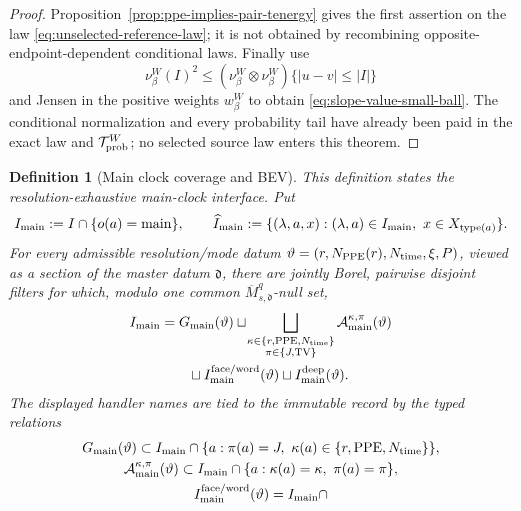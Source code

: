 \documentclass[11pt]{article}
\newtheorem{definition}[theorem]{Definition}
\begin{document}
\begin{proof}
Proposition~\ref{prop:ppe-implies-pair-tenergy} gives the first assertion
on the law \eqref{eq:unselected-reference-law}; it is not obtained by
recombining opposite-endpoint-dependent conditional laws.  Finally use
\[
 \nu_\beta^{W}(I)^2\le
 (\nu_\beta^{W}\otimes\nu_\beta^{W})\{|u-v|\le|I|\}
\]
and Jensen in the positive weights $w_\beta^{W}$ to obtain
\eqref{eq:slope-value-small-ball}.  The conditional normalization and every
probability tail have already been paid in the exact law and
$\mathcal T_{\rm prob}^{W}$; no selected source law enters this theorem.
\end{proof}

\begin{definition}[Main clock coverage and BEV]
\label{def:main-source-BEV}
This definition states the resolution-exhaustive main-clock interface.  Put
\[
 I_{\rm main}:=I\cap\{o(a)={\rm main}\},
 \qquad
 \widehat I_{\rm main}:=
 \{(\lambda,a,x):(\lambda,a)\in I_{\rm main},\
                    x\in X_{\operatorname{type}(a)}\}.
\]
For every admissible resolution/mode datum
$\vartheta=(r,N_{\rm PPE}(r),N_{\rm time},\xi,P)$, viewed as a section of
the master datum $\mathfrak d$, there are jointly Borel,
pairwise disjoint filters for which, modulo one common
$\overline M_{s,\mathfrak d}^{q}$-null set,
\begin{equation}
\label{eq:main-clock-coverage}
\begin{aligned}
 I_{\rm main}
 &=G_{\rm main}(\vartheta)
 \sqcup\!\bigsqcup_{\substack{
      \kappa\in\{r,{\rm PPE},N_{\rm time}\}\\
      \pi\in\{J,{\rm TV}\}}}
      \mathcal A_{\rm main}^{\kappa,\pi}(\vartheta)\\
 &\qquad\sqcup I_{\rm main}^{\rm face/word}(\vartheta)
 \sqcup I_{\rm main}^{\rm deep}(\vartheta).
\end{aligned}
\end{equation}
The displayed handler names are tied to the immutable record by the typed
relations
\begin{equation}
\label{eq:main-handler-record-compatibility}
\begin{gathered}
 G_{\rm main}(\vartheta)
   \subset I_{\rm main}\cap
   \{a:\pi(a)=J,\ \kappa(a)\in\{r,{\rm PPE},N_{\rm time}\}\},\\
 \mathcal A_{\rm main}^{\kappa,\pi}(\vartheta)
   \subset I_{\rm main}\cap
      \{a:\kappa(a)=\kappa,\ \pi(a)=\pi\},\\
 I_{\rm main}^{\rm face/word}(\vartheta)
   = I_{\rm main}\cap

\end{gathered}
\end{equation}
\end{definition}
\end{document}

